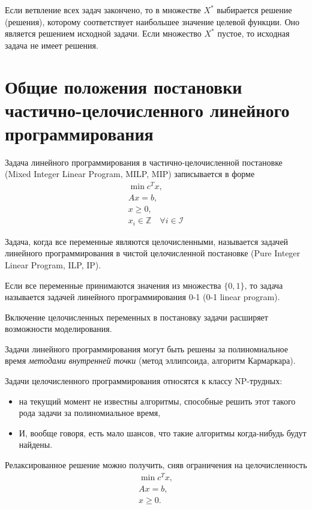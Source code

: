 \documentclass[%
	11pt,
	a4paper,
	utf8,
		]{article}
\begin{document}
Если ветвление всех задач закончено, то в множестве $ X^* $ выбирается решение (решения), которому соответствует наибольшее значение целевой функции. Оно является решением исходной задачи. Если множество $ X^* $ пустое, то исходная задача не имеет решения.


\section{Общие положения постановки частично-целочисленного линейного программирования}

Задача линейного программирования в частично-целочисленной постановке (Mixed Integer Linear Program, MILP, MIP) записывается в форме
\begin{align*}
	\min c^T x,\\
	Ax = b,\\
	x \geqslant 0,\\
	x_i \in \mathbb{Z} \quad \forall i \in \mathcal{I}
\end{align*}

Задача, когда все переменные являются целочисленными, называется задачей линейного программирования в чистой целочисленной постановке (Pure Integer Linear Program, ILP, IP).

Если все переменные принимаются значения из множества $ \{ 0, 1 \} $, то задача называется задачей линейного программирования 0-1 (0-1 linear program).

Включение целочисленных переменных в постановку задачи расширяет возможности моделирования.

Задачи линейного программирования могут быть решены за полиномиальное время \emph{методами внутренней точки} (метод эллипсоида, алгоритм Кармаркара). 

Задачи целочисленного программирования относятся к классу NP-трудных:
\begin{itemize}
	\item на текущий момент не известны алгоритмы, способные решить этот такого рода задачи за полиномиальное время,
	
	\item И, вообще говоря, есть мало шансов, что такие алгоритмы когда-нибудь будут найдены.
\end{itemize}

Релаксированное решение можно получить, сняв ограничения на целочисленность
\begin{align*}
	\min c^T x,\\
	Ax = b,\\
	x \geqslant 0.
\end{align*}
\end{document}
